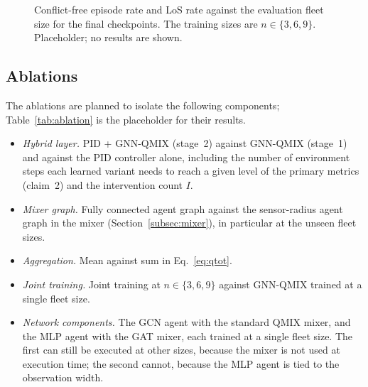 \begin{figure}[hbt!]
\centering
{}
\caption{\label{fig:zeroshot} Conflict-free episode rate and LoS rate against the evaluation
fleet size for the final checkpoints. The training sizes are $n\in\{3,6,9\}$. Placeholder;
no results are shown.}
\end{figure}

\subsection{Ablations}
\label{subsec:results-ablations}
The ablations are planned to isolate the following components; Table~\ref{tab:ablation} is
the placeholder for their results.
\begin{itemize}
\item \emph{Hybrid layer.} PID + GNN-QMIX (stage~2) against GNN-QMIX (stage~1) and against
      the PID controller alone, including the number of environment steps each learned
      variant needs to reach a given level of the primary metrics (claim~2) and the
      intervention count $I$.
\item \emph{Mixer graph.} Fully connected agent graph against the sensor-radius agent graph
      in the mixer (Section~\ref{subsec:mixer}), in particular at the unseen fleet sizes.
\item \emph{Aggregation.} Mean against sum in Eq.~\eqref{eq:qtot}.
\item \emph{Joint training.} Joint training at $n\in\{3,6,9\}$ against GNN-QMIX trained at
      a single fleet size.
\item \emph{Network components.} The GCN agent with the standard QMIX mixer, and the MLP
      agent with the GAT mixer, each trained at a single fleet size. The first can still be
      executed at other sizes, because the mixer is not used at execution time; the second
      cannot, because the MLP agent is tied to the observation width.
\end{itemize}

